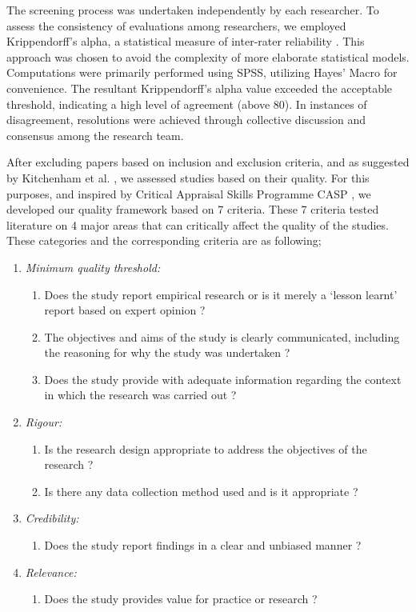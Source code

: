 \documentclass[review]{elsarticle}
\begin{document}
The screening process was undertaken independently by each researcher. To assess the consistency of evaluations among researchers, we employed Krippendorff's alpha, a statistical measure of inter-rater reliability \cite{krippendorff2011computing}. This approach was chosen to avoid the complexity of more elaborate statistical models. Computations were primarily performed using SPSS, utilizing Hayes' Macro for convenience. The resultant Krippendorff's alpha value exceeded the acceptable threshold, indicating a high level of agreement (above 80). In instances of disagreement, resolutions were achieved through collective discussion and consensus among the research team.

After excluding papers based on inclusion and exclusion criteria, and as suggested by Kitchenham et al. \cite{kitchenham2015evidence}, we assessed studies based on their quality. For this purposes, and inspired by Critical Appraisal Skills Programme CASP \cite{CASP}, we developed our quality framework based on 7 criteria. These 7 criteria tested literature on 4 major areas that can critically affect the quality of the studies. These categories and the corresponding criteria are as following;

\begin{enumerate}
    \item \emph{Minimum quality threshold:} 
    \begin{enumerate}
        \item Does the study report empirical research or is it merely a `lesson learnt' report based on expert opinion ?
        \item The objectives and aims of the study is clearly communicated, including the reasoning for why the study was undertaken ? 
        \item Does the study provide with adequate information regarding the context in which the research was carried out ?
    \end{enumerate}
    \item \emph{Rigour:}
    \begin{enumerate}
        \item Is the research design appropriate to address the objectives of the research ?
        \item Is there any data collection method used and is it appropriate ?
    \end{enumerate}
    \item \emph{Credibility:}
      \begin{enumerate}
        \item Does the study report findings in a clear and unbiased manner ? 
     \end{enumerate}
    \item \emph{Relevance:}
    \begin{enumerate}
        \item Does the study provides value for practice or research ?
     \end{enumerate}
\end{enumerate}
\end{document}
